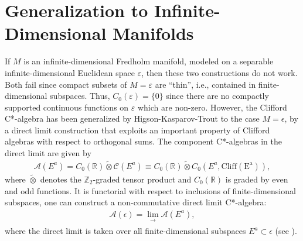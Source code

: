 \documentclass[11pt, twoside, a4paper]{article}
\theoremstyle{mytheoremstyle}
\begin{document}
\section{Generalization to Infinite-Dimensional Manifolds}
If \(M\) is an infinite-dimensional Fredholm manifold, modeled on a separable infinite-dimensional Euclidean space \(\varepsilon\), then these two constructions do not work. Both fail since compact subsets of \(M = \varepsilon\) are “thin”, i.e., contained in finite-dimensional subspaces. Thus, \(C_{0}(\varepsilon) = \{0\}\) since there are no compactly supported continuous functions on \(\varepsilon\) which are non-zero. However, the Clifford C*-algebra has been generalized by Higson-Kasparov-Trout to the case \(M = \epsilon\), by a direct limit construction that exploits an important property of Clifford algebras with respect to orthogonal sums. The component C*-algebras in the direct limit are given by
\begin{align}
    \mathcal{A}(E^{a}) = C_{0}(\mathbb{R}) \widetilde{\otimes} \mathcal{C}(E^{a}) \equiv C_{0}(\mathbb{R}) \widetilde{\otimes} C_{0}(E^{a}, \operatorname{Cliff(E^{a})}),
\end{align}
where \(\widetilde{\otimes}\) denotes the \(\mathbb{Z}_{2}\)-graded tensor product and \(C_{0}(\mathbb{R})\) is graded by even and odd functions. It is functorial with respect to inclusions of finite-dimensional subspaces, one can construct a non-commutative direct limit C*-algebra:
\begin{align}
    \mathcal{A}(\epsilon) = \lim_{\substack{\to}} \mathcal{A}(E^{a}),
\end{align}
where the direct limit is taken over all finite-dimensional subspaces \(E^{a} \subset \epsilon\) (see {\color{blue}\cite{olsen2010}}).
\end{document}
